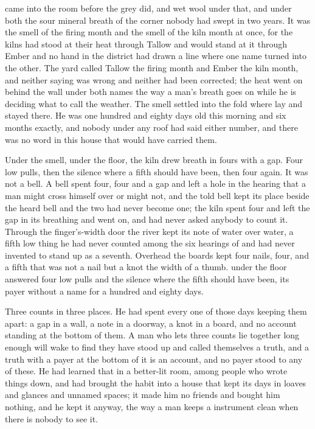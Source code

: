 
 came into the room before the grey did, and wet wool under that, and under both the sour mineral breath of the corner nobody had swept in two years. It was the smell of the firing month and the smell of the kiln month at once, for the kilns had stood at their heat through Tallow and would stand at it through Ember and no hand in the district had drawn a line where one name turned into the other. The yard called Tallow the firing month and Ember the kiln month, and neither saying was wrong and neither had been corrected; the heat went on behind the wall under both names the way a man's breath goes on while he is deciding what to call the weather. The smell settled into the fold where  lay and stayed there. He was one hundred and eighty days old this morning and six months exactly, and nobody under any roof had said either number, and there was no word in this house that would have carried them.

Under the smell, under the floor, the kiln drew breath in fours with a gap. Four low pulls, then the silence where a fifth should have been, then four again. It was not a bell. A bell spent four, four and a gap and left a hole in the hearing that a man might cross himself over or might not, and the told bell kept its place beside the heard bell and the two had never become one; the kiln spent four and left the gap in its breathing and went on, and had never asked anybody to count it. Through the finger's-width door the river kept its note of water over water, a fifth low thing he had never counted among the six hearings of  and had never invented to stand up as a seventh. Overhead the boards kept four nails, four, and a fifth that was not a nail but a knot the width of a thumb.  under the floor answered four low pulls and the silence where the fifth should have been, its payer without a name for a hundred and eighty days.

Three counts in three places. He had spent every one of those days keeping them apart: a gap in a wall, a note in a doorway, a knot in a board, and no account standing at the bottom of them. A man who lets three counts lie together long enough will wake to find they have stood up and called themselves a truth, and a truth with a payer at the bottom of it is an account, and no payer stood to any of these. He had learned that in a better-lit room, among people who wrote things down, and had brought the habit into a house that kept its days in loaves and glances and unnamed spaces; it made him no friends and bought him nothing, and he kept it anyway, the way a man keeps a instrument clean when there is nobody to see it.

